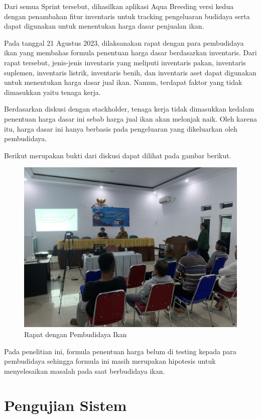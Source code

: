 \begin{spacing}{1.5}
Dari semua Sprint tersebut, dihasilkan aplikasi Aqua Breeding versi kedua dengan penambahan fitur inventaris untuk tracking pengeluaran budidaya serta dapat digunakan untuk menentukan harga dasar penjualan ikan.

Pada tanggal 21 Agustus 2023, dilaksanakan rapat dengan para pembudidaya ikan yang membahas formula penentuan harga dasar berdasarkan inventaris. Dari rapat tersebut, jenis-jenis inventaris yang meliputi inventaris pakan, inventaris suplemen, inventaris listrik, inventaris benih, dan inventaris aset dapat digunakan untuk menentukan harga dasar jual ikan. Namun, terdapat faktor yang tidak dimasukkan yaitu tenaga kerja.

Berdasarkan diskusi dengan stackholder, tenaga kerja tidak dimasukkan kedalam penentuan harga dasar ini sebab harga jual ikan akan melonjak naik. Oleh karena itu, harga dasar ini hanya berbasis pada pengeluaran yang dikeluarkan oleh pembudidaya.

Berikut merupakan bukti dari diskusi dapat dilihat pada gambar berikut.

\begin{figure}[H]
	\centering
	\includegraphics[width=1\textwidth]{gambar/IMG_7656.jpg}
	\caption{Rapat dengan Pembudidaya Ikan}
\end{figure}

Pada penelitian ini, formula penentuan harga belum di testing kepada para pembudidaya sehingga formula ini masih merupakan hipotesis untuk menyelesaikan masalah pada saat berbudidaya ikan.

\section{Pengujian Sistem}


\end{spacing}
